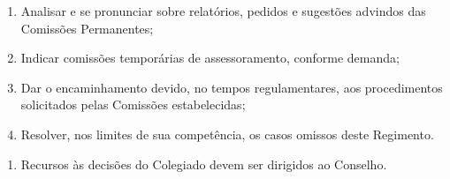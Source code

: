 \documentclass{article}
\newcommand{\singleitem}{\item[Parágrafo Único.]}
\newcommand{\grupoMenor}{Colegiado\xspace}
\newcommand{\grupoMaior}{Conselho\xspace}
\begin{document}
\begin{enumerate}
\begin{enumerate}[label=\Roman*]
		\item Analisar e se pronunciar sobre relatórios, pedidos e sugestões advindos das Comissões Permanentes;
		\item Indicar comissões temporárias de assessoramento, conforme demanda;
		\item Dar o encaminhamento devido, no tempos regulamentares, aos procedimentos solicitados pelas Comissões estabelecidas;
		\item Resolver, nos limites de sua competência, os casos omissos deste Regimento.
	\end{enumerate}

	\begin{enumerate}
		\singleitem Recursos às decisões do \grupoMenor devem ser dirigidos ao \grupoMaior.
	\end{enumerate}
\end{enumerate}
\end{document}
